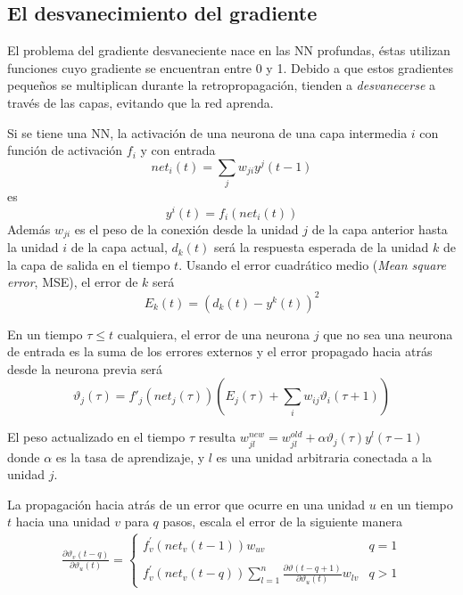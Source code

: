 \subsection{El desvanecimiento del gradiente}
El problema del gradiente desvaneciente nace en las NN profundas, éstas utilizan funciones cuyo gradiente se encuentran entre 0 y 1. Debido a que estos gradientes pequeños se multiplican durante la retropropagación, tienden a {\em desvanecerse} a través de las capas, evitando que la red aprenda.

Si se tiene una NN, la activación de una neurona de una capa intermedia $i$ con función de activación $f_i$ y con entrada $$ net_{i}(t) = \sum_{j}w_{ji}y^{j}(t - 1) $$ es $$y^{i}(t) = f_{i}(net_{i}(t))$$ Además $w_{ji}$ es el peso de la conexión desde la unidad $j$ de la capa anterior hasta la unidad $i$ de la capa actual, $d_{k}(t)$ será la respuesta esperada de la unidad $k$ de la capa de salida en el tiempo $t$. Usando el error cuadrático medio ({\em Mean square error}, MSE), el error de $k$ será
$$ E_{k}(t) = (d_{k}(t) - y^{k}(t))^2 $$

En un tiempo $\tau \leq t$ cualquiera, el error de una neurona $j$ que no sea una neurona de entrada es la suma de los errores externos y el error propagado hacia atrás desde la neurona previa será
$$ \vartheta_{j}(\tau) = f'_{j}(net_{j}(\tau))\left(E_{j}(\tau) + \sum_{i} w_{ij}\vartheta_{i}(\tau + 1)\right) $$

El peso actualizado en el tiempo $\tau$ resulta $w_{jl}^{new} = w_{jl}^{old} + \alpha\vartheta_{j}(\tau) y^{l}(\tau - 1)$ donde $\alpha$ es la tasa de aprendizaje, y $l$ es una unidad arbitraria conectada a la unidad $j$.

La propagación hacia atrás de un error que ocurre en una unidad $u$ en un tiempo $t$ hacia una unidad $v$ para $q$ pasos, escala el error de la siguiente manera
\begin{eqnarray}
\frac{\partial\vartheta_{v}(t - q)}{\partial\vartheta_{u}(t)} =
\left\{
\begin{array}{lr}
	f^{'}_{v}(net_{v}(t - 1))w_{uv}	& q = 1\\
	\\
	f^{'}_{v}(net_{v}(t - q))\sum^{n}_{l=1}\frac{\partial\vartheta(t - q + 1)}{\partial\vartheta_{u}(t)}w_{lv}	& q > 1
\end{array}
\right.
\end{eqnarray}

